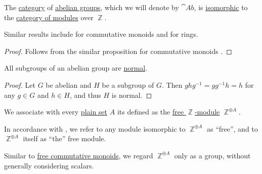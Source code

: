 \begin{proposition}\label{thm:category_of_abelian_groups}
  The \hyperref[def:category]{category} of \hyperref[def:abelian_group]{abelian groups}, which we will denote by \( \cat{Ab} \), is \hyperref[rem:category_similarity/isomorphism]{isomorphic} to the \hyperref[def:module/category]{category of modules} over \( \BbbZ \).
\end{proposition}
\begin{comments}
  \item Similar results include  for commutative monoids and  for rings.
\end{comments}
\begin{proof}
  Follows from the similar proposition for commutative monoids .
\end{proof}

\begin{proposition}\label{thm:abelian_normal_subgroups}
  All subgroups of an abelian group are \hyperref[def:normal_subgroup]{normal}.
\end{proposition}
\begin{proof}
  Let \( G \) be abelian and \( H \) be a subgroup of \( G \). Then \( g h g^{-1} = gg^{-1} h = h \) for any \( g \in G \) and \( h \in H \), and thus \( H \) is normal.
\end{proof}

\begin{definition}\label{def:free_abelian_group}\mimprovised
  We associate with every \hyperref[def:set]{plain set} \( A \) its  defined as the \hyperref[def:free_semimodule]{free \( \BbbZ \)-module} \( \BbbZ^{\oplus A} \).
\end{definition}
\begin{comments}
  \item In accordance with , we refer to any module isomorphic to \( \BbbZ^{\oplus A} \) as \enquote{free}, and to \( \BbbZ^{\oplus A} \) itself as \enquote{the} free module.

  \item Similar to \hyperref[def:free_commutative_monoid]{free commutative monoids}, we regard \( \BbbZ^{\oplus A} \) only as a group, without generally considering scalars.
\end{comments}

